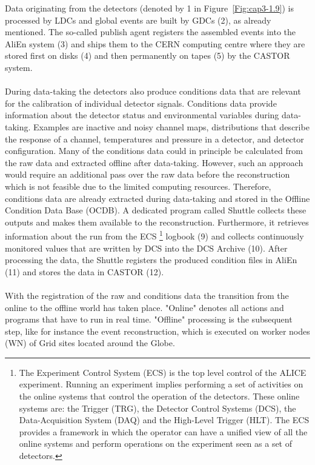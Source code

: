 Data originating from the detectors (denoted by 1 in \mbox{Figure \ref{Fig:cap3-1.9}}) is processed by LDCs and global events are built by GDCs (2), as already mentioned. The so-called publish agent registers the assembled events into the AliEn system (3) and ships them to the CERN computing centre where they are stored first on disks (4) and then permanently on tapes (5) by the CASTOR system.\\
\\
During data-taking the detectors also produce conditions data that are relevant for the calibration of individual detector signals. Conditions data provide information about the detector status and environmental variables during data-taking. Examples are inactive and noisy channel maps, distributions that describe the response of a channel, temperatures and pressure in a detector, and detector configuration. Many of the conditions data could in principle be calculated from the raw data and extracted offline after data-taking. However, such an approach would require an additional pass over the raw data before the reconstruction which is not feasible due to the limited computing resources. Therefore, conditions data are already extracted during data-taking and stored in the Offline Condition Data Base (OCDB). A dedicated program called Shuttle collects these outputs and makes them available to the reconstruction. Furthermore, it retrieves information about the run from the ECS \footnote{The Experiment Control System (ECS) is the top level control of the ALICE experiment. Running an experiment implies performing a set of activities on the online systems that control the operation of the detectors. These online systems are: the Trigger (TRG), the Detector Control Systems (DCS), the Data-Acquisition System (DAQ) and the High-Level Trigger (HLT). The ECS provides a framework in which the operator can have a unified view of all the online systems and perform operations on the experiment seen as a set of detectors.} logbook (9) and collects continuously monitored values that are written by DCS into the DCS Archive (10). After processing the data, the Shuttle registers the produced condition files in AliEn (11) and stores the data in CASTOR (12).\\
\\
With the registration of the raw and conditions data the transition from the online to the offline world has taken place. "Online" denotes all actions and programs that have to run in real time. "Offline" processing is the subsequent step, like for instance the event reconstruction, which is executed on worker nodes (WN) of Grid sites located around the Globe.




